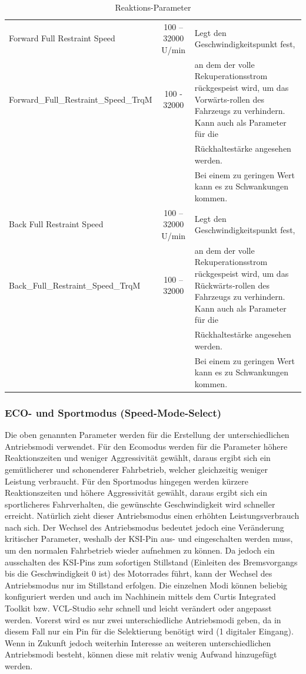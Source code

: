 \begin{table}[H]
\begin{tabular}{|lcp{6cm}|}
		Forward Full Restraint Speed & 100 – 32000 U/min & Legt den Geschwindigkeitspunkt fest,\\   Forward\_Full\_Restraint\_Speed\_TrqM & 100 - 32000 & an dem der volle Rekuperationsstrom rückgespeist wird, um das Vorwärts-rollen des Fahrzeugs zu verhindern. Kann auch als Parameter für die              \\&&Rückhaltestärke angesehen werden.\\&& Bei einem zu geringen Wert kann es zu Schwankungen kommen.  \\\hline
		Back Full Restraint Speed & 100 – 32000 U/min & Legt den Geschwindigkeitspunkt fest,\\ 		Back\_Full\_Restraint\_Speed\_TrqM & 100 – 32000 & an dem der volle Rekuperationsstrom rückgespeist wird, um das Rückwärts-rollen des Fahrzeugs zu verhindern. Kann auch als Parameter für die 				\\&&Rückhaltestärke angesehen werden.\\&& Bei einem zu geringen Wert kann es zu Schwankungen kommen. \\\hline		
	\end{tabular}	
	\caption{Reaktions-Parameter}
	\label{tab:Reaktions-Parameter}
\end{table}


\newpage

\subsubsection{ECO- und Sportmodus (Speed-Mode-Select)}
Die oben genannten Parameter werden für die Erstellung der unterschiedlichen Antriebsmodi verwendet. Für den Ecomodus werden für die Parameter höhere Reaktionszeiten und weniger Aggressivität gewählt, daraus ergibt sich ein gemütlicherer und schonenderer Fahrbetrieb, welcher gleichzeitig weniger Leistung verbraucht. Für den Sportmodus hingegen werden kürzere Reaktionszeiten und höhere Aggressivität gewählt, daraus ergibt sich ein sportlicheres Fahrverhalten, die gewünschte Geschwindigkeit wird schneller erreicht. Natürlich zieht dieser Antriebsmodus einen erhöhten Leistungsverbrauch nach sich. Der Wechsel des Antriebsmodus bedeutet jedoch eine Veränderung kritischer Parameter, weshalb der KSI-Pin aus- und eingeschalten werden muss, um den normalen Fahrbetrieb wieder aufnehmen zu können. Da jedoch ein ausschalten des KSI-Pins zum sofortigen Stillstand (Einleiten des Bremsvorgangs bis die Geschwindigkeit 0 ist) des Motorrades führt, kann der Wechsel des Antriebsmodus nur im Stillstand erfolgen. Die einzelnen Modi können beliebig konfiguriert werden und auch im Nachhinein mittels dem Curtis Integrated Toolkit bzw. VCL-Studio sehr schnell und leicht verändert oder angepasst werden. Vorerst wird es nur zwei unterschiedliche Antriebsmodi geben, da in diesem Fall nur ein Pin für die Selektierung benötigt wird (1 digitaler Eingang). Wenn in Zukunft jedoch weiterhin Interesse an weiteren unterschiedlichen Antriebsmodi besteht, können diese mit relativ wenig Aufwand hinzugefügt werden.


